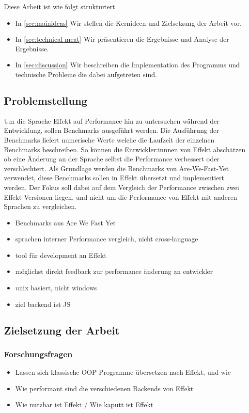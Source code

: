 \medskip
Diese Arbeit ist wie folgt strukturiert
\begin{itemize}
    \item In \cref{sec:mainideas} Wir stellen die Kernideen und Zielsetzung der Arbeit vor.
    \item In \cref{sec:technical-meat} Wir präsentieren die Ergebnisse und Analyse der Ergebnisse.
    \item In \cref{sec:discussion} Wir beschreiben die Implementation des Programms und technische Probleme die dabei aufgetreten sind.
\end{itemize}

\subsection{ Problemstellung }
Um die Sprache Effekt auf Performance hin zu untersuchen während der Entwicklung, sollen Benchmarks ausgeführt werden.
Die Ausführung der Benchmarks liefert numerische Werte welche die Laufzeit der einzelnen Benchmarks beschreiben. So können die Entwickler:innnen von Effekt
abschätzen ob eine Änderung an der Sprache selbst die Performance verbessert oder verschlechtert.
Als Grundlage werden die Benchmarks von Are-We-Fast-Yet verwendet, diese Benchmarks sollen in Effekt übersetzt und implementiert werden.
Der Fokus soll dabei auf dem Vergleich der Performance zwischen zwei Effekt Versionen liegen, und nicht um die Performance von Effekt mit anderen Sprachen zu vergleichen.

\begin{itemize}
    \item Benchmarks aus Are We Fast Yet
    \item sprachen interner Performance vergleich, nicht cross-language
    \item tool für development an Effekt
    \item möglichst direkt feedback zur performance änderung an entwickler
    \item unix basiert, nicht windows
    \item ziel backend ist JS
\end{itemize}

\subsection{ Zielsetzung der Arbeit}
\subsubsection{ Forschungsfragen }
\begin{itemize}
    \item Lassen sich klassische OOP Programme übersetzen nach Effekt, und wie
    \item Wie performant sind die verschiedenen Backends von Effekt
    \item Wie nutzbar ist Effekt / Wie kaputt ist Effekt
\end{itemize}


  